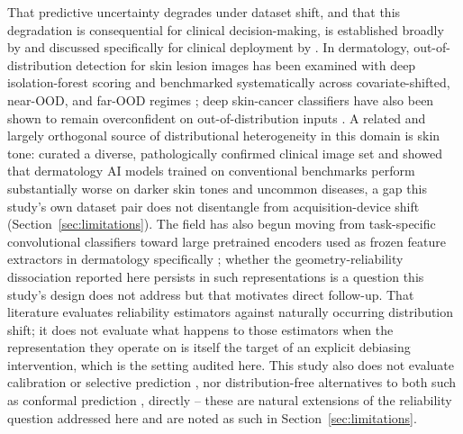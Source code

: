 That predictive uncertainty degrades under dataset shift, and that this degradation is consequential for clinical decision-making, is established broadly by \citet{ovadia2019can} and discussed specifically for clinical deployment by \citet{finlayson2021clinician}. In dermatology, out-of-distribution detection for skin lesion images has been examined with deep isolation-forest scoring \citep{li2020deepif} and benchmarked systematically across covariate-shifted, near-OOD, and far-OOD regimes \citep{gutbrod2025openmibood}; deep skin-cancer classifiers have also been shown to remain overconfident on out-of-distribution inputs \citep{pacheco2020outofdistribution}. A related and largely orthogonal source of distributional heterogeneity in this domain is skin tone: \citet{daneshjou2022disparities} curated a diverse, pathologically confirmed clinical image set and showed that dermatology AI models trained on conventional benchmarks perform substantially worse on darker skin tones and uncommon diseases, a gap this study's own dataset pair does not disentangle from acquisition-device shift (Section~\ref{sec:limitations}). The field has also begun moving from task-specific convolutional classifiers toward large pretrained encoders used as frozen feature extractors in dermatology specifically \citep{yan2025panderm}; whether the geometry-reliability dissociation reported here persists in such representations is a question this study's design does not address but that motivates direct follow-up. That literature evaluates reliability estimators against naturally occurring distribution shift; it does not evaluate what happens to those estimators when the representation they operate on is itself the target of an explicit debiasing intervention, which is the setting audited here. This study also does not evaluate calibration \citep{guo2017calibration} or selective prediction \citep{elyaniv2010foundations, geifman2017selective}, nor distribution-free alternatives to both such as conformal prediction \citep{angelopoulos2023conformal}, directly -- these are natural extensions of the reliability question addressed here and are noted as such in Section~\ref{sec:limitations}.
